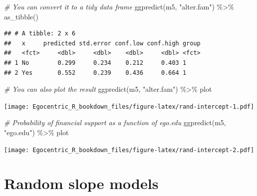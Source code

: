 \documentclass[
]{book}
\newenvironment{Shaded}{\begin{snugshade}}{\end{snugshade}}
\newcommand{\CommentTok}[1]{\textcolor[rgb]{0.56,0.35,0.01}{\textit{#1}}}
\newcommand{\FunctionTok}[1]{\textcolor[rgb]{0.00,0.00,0.00}{#1}}
\newcommand{\NormalTok}[1]{#1}
\newcommand{\SpecialCharTok}[1]{\textcolor[rgb]{0.00,0.00,0.00}{#1}}
\newcommand{\StringTok}[1]{\textcolor[rgb]{0.31,0.60,0.02}{#1}}
\begin{document}
\begin{Shaded}
\begin{Highlighting}[]
\CommentTok{\# You can convert it to a tidy data frame}
\FunctionTok{ggpredict}\NormalTok{(m5, }\StringTok{"alter.fam"}\NormalTok{) }\SpecialCharTok{\%\textgreater{}\%}
  \FunctionTok{as\_tibble}\NormalTok{()}
\end{Highlighting}
\end{Shaded}

\begin{verbatim}
## # A tibble: 2 x 6
##   x     predicted std.error conf.low conf.high group
##   <fct>     <dbl>     <dbl>    <dbl>     <dbl> <fct>
## 1 No        0.299     0.234    0.212     0.403 1    
## 2 Yes       0.552     0.239    0.436     0.664 1
\end{verbatim}

\begin{Shaded}
\begin{Highlighting}[]
\CommentTok{\# You can also plot the result}
\FunctionTok{ggpredict}\NormalTok{(m5, }\StringTok{"alter.fam"}\NormalTok{) }\SpecialCharTok{\%\textgreater{}\%}
\NormalTok{  plot}
\end{Highlighting}
\end{Shaded}

\texttt{[image: Egocentric\_R\_bookdown\_files/figure-latex/rand-intercept-1.pdf]}

\begin{Shaded}
\begin{Highlighting}[]
\CommentTok{\# Probability of financial support as a function of ego.edu}
\FunctionTok{ggpredict}\NormalTok{(m5, }\StringTok{"ego.edu"}\NormalTok{) }\SpecialCharTok{\%\textgreater{}\%}
\NormalTok{  plot}
\end{Highlighting}
\end{Shaded}

\texttt{[image: Egocentric\_R\_bookdown\_files/figure-latex/rand-intercept-2.pdf]}

\hypertarget{random-slope-models}{%
\section{Random slope models}\label{random-slope-models}}
\end{document}
